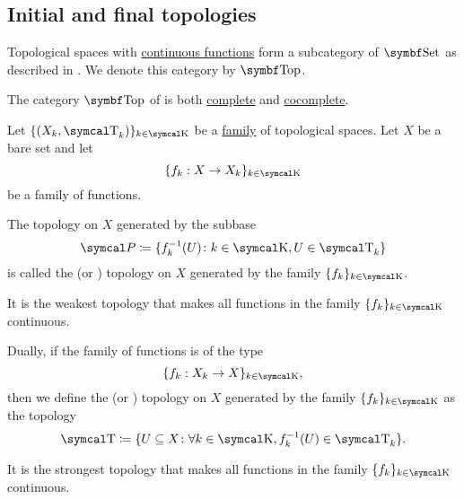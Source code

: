 \subsection{Initial and final topologies}\label{subsec:initial_final_topologies}

\begin{Definition}\label{def:category_of_topological_spaces}
  Topological spaces with \hyperref[def:global_continuity]{continuous functions} form a subcategory of \( \Cat{Set} \) as described in . We denote this category by \( \Cat{Top} \).
\end{Definition}

\begin{Theorem}\label{thm:top_complete_cocomplete}
  The category \( \Cat{Top} \) of is both \hyperref[def:categorical_limit]{complete} and \hyperref[def:categorical_colimit]{cocomplete}.
\end{Theorem}

\begin{Definition}\label{def:initial_topology}\cite{nLab:top}
  Let \( \{ (X_k, \CT_k) \}_{k \in \CK} \) be a \hyperref[def:indexed_family]{family} of topological spaces. Let \( X \) be a bare set and let
  \begin{equation*}
    \{ f_k: X \to X_k \}_{k \in \CK}
  \end{equation*}
  be a family of functions.

  The topology on \( X \) generated by the subbase
  \begin{equation*}
    \Cal{P} \coloneqq \{ f_k^{-1}(U) \colon k \in \CK, U \in \CT_k \}
  \end{equation*}
  is called the  (or ) topology on \( X \) generated by the family \( \{ f_k \}_{k \in \CK} \).

  It is the weakest topology that makes all functions in the family \( \{ f_k \}_{k \in \CK} \) continuous.
\end{Definition}

\begin{Definition}\label{def:final_topology}\cite{nLab:top}
  Dually, if the family of functions is of the type
  \begin{equation*}
    \{ f_k: X_k \to X \}_{k \in \CK},
  \end{equation*}
  then we define the  (or ) topology on \( X \) generated by the family \( \{ f_k \}_{k \in \CK} \) as the topology
  \begin{equation*}
    \CT \coloneqq \{ U \subseteq X \colon \forall k \in \CK, f_k^{-1}(U) \in \CT_k \}.
  \end{equation*}

  It is the strongest topology that makes all functions in the family \( \{ f_k \}_{k \in \CK} \) continuous.
\end{Definition}

